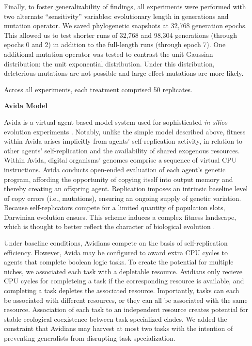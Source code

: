 Finally, to foster generalizability of findings, all experiments were performed with two alternate ``sensitivity'' variables: evolutionary length in generations and mutation operator.
We saved phylogenetic snapshots at 32,768 generation epochs.
This allowed us to test shorter runs of 32,768 and 98,304 generations (through epochs 0 and 2) in addition to the full-length runs (through epoch 7).
One additional mutation operator was tested to contrast the unit Gaussian distribution: the unit exponential distribution.
Under this distribution, deleterious mutations are not possible and large-effect mutations are more likely.

Across all experiments, each treatment comprised 50 replicates.

\noindent
\textbf{Avida Model}

\noindent
Avida is a virtual agent-based model system used for sophisticated \textit{in silico} evolution experiments \citep{ofria2004avida}.
Notably, unlike the simple model described above, fitness within Avida arises implicitly from agents' self-replication activity, in relation to other agents' self-replication and the availability of shared exogenous resources.
Within Avida, digital organisms' genomes comprise a sequence of virtual CPU instructions.
Avida conducts open-ended evaluation of each agent's genetic program, affording the opportunity of copying itself into output memory and thereby creating an offspring agent.
Replication imposes an intrinsic baseline level of copy errors (i.e., mutations), ensuring an ongoing supply of genetic variation.
Because self-replicators compete for a limited quantity of population slots, Darwinian evolution ensues.
This scheme induces a complex fitness landscape, which is thought to better reflect the character of biological evolution \citep{adami2006digital}.

Under baseline conditions, Avidians compete on the basis of self-replication efficiency.
However, Avida may be configured to award extra CPU cycles to agents that complete boolean logic tasks.
To create the potential for multiple niches, we associated each task with a depletable resource.
Avidians only recieve CPU cycles for completeing a task if the corresponding resource is available, and completing a task depletes the associated resource.
Importantly, tasks can each be associated with different resources, or they can all be associated with the same resource.
Association of each task to an independent resource creates potential for stable ecological coexistence between task-specialized clades.
We added the constraint that Avidians may harvest at most two tasks with the intention of preventing generalists from disrupting task specialization.

